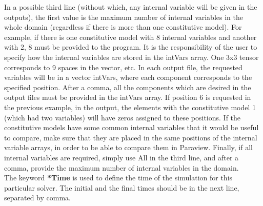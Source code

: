 \documentclass[oneside,11pt,times]{book}
\begin{document}
In a possible third line (without which, any internal variable will be given in the outputs), the first value is the maximum number of internal variables in the whole domain (regardless if there is more than one constitutive model). For example, if there is one constitutive model with 8 internal variables and another with 2, 8 must be provided to the program. It is the responsibility of the user to specify how the internal variables are stored in the intVars array. One 3x3 tensor corresponds to 9 spaces in the vector, etc. In each output file, the requested variables will be in a vector intVars, where each component corresponds to the specified position. After a comma, all the components which are desired in the output files must be provided in the intVars array. If position 6 is requested in the previous example, in the output, the elements with the constitutive model 1 (which had two variables) will have zeros assigned to these positions. If the constitutive models have some common internal variables that it would be useful to compare, make sure that they are placed in the same positions of the internal variable arrays, in order to be able to compare them in Paraview. Finally, if all internal variables are required, simply use All in the third line, and after a comma, provide the maximum number of internal variables in the domain.\\

The keyword \textbf{*Time} is used to define the time of the simulation for this particular solver. The initial and the final times should be in the next line, separated by comma.  \\
\end{document}
